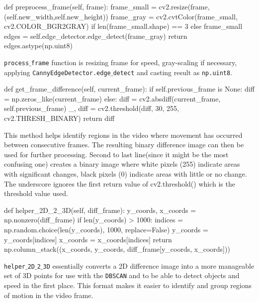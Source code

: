 \documentclass{article}
\begin{document}
	\begin{python}
def preprocess_frame(self, frame):
	frame_small = cv2.resize(frame, (self.new_width,self.new_height))
	frame_gray = cv2.cvtColor(frame_small, cv2.COLOR_BGR2GRAY) 
				if len(frame_small.shape) == 3 else frame_small
	edges = self.edge_detector.edge_detect(frame_gray)
	return edges.astype(np.uint8)\end{python}
	
	\texttt{process$\_$frame} function is resizing frame for speed, gray-scaling if necessary, applying \texttt{CannyEdgeDetector.edge$\_$detect} and casting result as \texttt{np.uint8}.
	
	\begin{python}
def get_frame_difference(self, current_frame):
	if self.previous_frame is None:
		diff = np.zeros_like(current_frame)
	else:
		diff = cv2.absdiff(current_frame, self.previous_frame)
	_, diff = cv2.threshold(diff, 30, 255, cv2.THRESH_BINARY)
	return diff\end{python}
	
	This method helps identify regions in the video where movement has occurred between consecutive frames. The resulting binary difference image can then be used for further processing. Second to last line(since it might be the most confusing one) creates a binary image where white pixels (255) indicate areas with significant changes, black pixels (0) indicate areas with little or no change. The underscore ignores the first return value of cv2.threshold() which is the threshold value used.
	
	\begin{python}
def helper_2D_2_3D(self, diff_frame):
	y_coords, x_coords = np.nonzero(diff_frame)
	if len(y_coords) > 1000:
		indices = np.random.choice(len(y_coords), 1000, replace=False)
		y_coords = y_coords[indices]
		x_coords = x_coords[indices]
	return np.column_stack((x_coords, y_coords, diff_frame[y_coords, x_coords]))\end{python}
	
	
	\texttt{helper$\_$2D$\_$2$\_$3D} essentially converts a 2D difference image into a more manageable set of 3D points for use with the \texttt{DBSCAN} and to be able to detect objects and speed in the first place. This format makes it easier to identify and group regions of motion in the video frame. 
	
\end{document}
